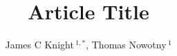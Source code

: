 \documentclass[utf8]{frontiersSCNS} %
\def\firstAuthorLast{Sample {et~al.}} %
\def\Authors{James C Knight\,$^{1,*}$, Thomas Nowotny\,$^{1}$}
\begin{document}
\onecolumn
{}

\title[Running Title]{Article Title} 

\author[\firstAuthorLast ]{\Authors} %
\address{} %
\correspondance{} %

\extraAuth{}%


\maketitle
\end{document}
